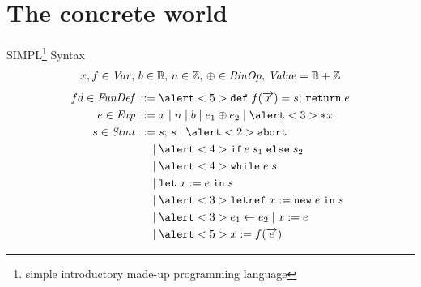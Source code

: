 \documentclass[aspectratio=169,notes]{beamer}
\begin{document}




\section{The concrete world}
\begin{frame}{SIMPL\footnote{simple introductory made-up programming language} Syntax}
  \vspace{-2em}
  \small
  \begin{gather*}
    x,f \in \mathit{Var},\, b \in \mathbb{B},\, n \in \mathbb{Z},\, \oplus \in \mathit{BinOp},\,\mathit{Value} = \mathbb{B} + \mathbb{Z}
  \end{gather*}\vspace{-2em}
  \begin{align*}
    fd \in \ns{FunDef} \eDEF & \alert<5>{\kw{def}\; f(\vo{x}) = s;\,\kw{return}\; e} \\
    e \in \Exp \eDEF & x \eOR n \eOR b \eOR e_1 \oplus e_2 \eOR \alert<3>{*x} \\ %
    s \in \Stmt \eDEF & s;\,s \eOR \alert<2>{\kw{abort}} \\
    \eOR & \alert<4>{\kw{if}\, e\; s_1 \; \kw{else} \; s_2} \\
    \eOR & \alert<4>{\kw{while}\; e\; s} \\
    \eOR & \kw{let}\; x := e \;\kw{in}\;s \\
    \eOR & \alert<3>{\kw{letref}\; x := \kw{new}\;e \;\kw{in}\;s} \\
    \eOR & \alert<3>{e_1 \update e_2} \eOR x := e \\
    \eOR & \alert<5>{x := f(\vo{e})}
  \end{align*}
\end{frame}
\end{document}

